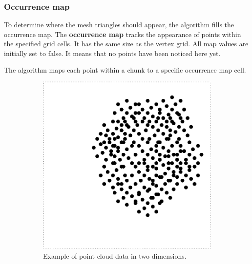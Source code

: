 \subsubsection{Occurrence map}

To determine where the mesh triangles should appear, the algorithm fills the occurrence map. The \textbf{occurrence map} tracks the appearance of points within the specified grid cells. It has the same size as the vertex grid. All map values are initially set to false. It means that no points have been noticed here yet.

The algorithm maps each point within a chunk to a specific occurrence map cell.

\begin{figure}[ht]
    \centering
    
    \begin{subfigure}[t]{0.3\textwidth}
        \includegraphics[width=\textwidth]{point-cloud-plot.pdf}
        \caption{Example of point cloud data in two dimensions.}
    \end{subfigure}
    \begin{subfigure}[t]{0.3\textwidth}

\end{subfigure}
\end{figure}

